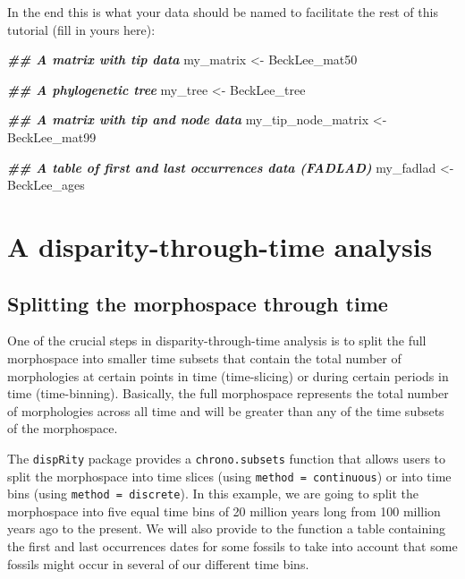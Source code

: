 \documentclass[
]{book}
\newenvironment{Shaded}{\begin{snugshade}}{\end{snugshade}}
\newcommand{\DocumentationTok}[1]{\textcolor[rgb]{0.56,0.35,0.01}{\textbf{\textit{#1}}}}
\newcommand{\NormalTok}[1]{#1}
\newcommand{\OtherTok}[1]{\textcolor[rgb]{0.56,0.35,0.01}{#1}}
\begin{document}
In the end this is what your data should be named to facilitate the rest of this tutorial (fill in yours here):

\begin{Shaded}
\begin{Highlighting}[]
\DocumentationTok{\#\# A matrix with tip data}
\NormalTok{my\_matrix }\OtherTok{\textless{}{-}}\NormalTok{ BeckLee\_mat50}

\DocumentationTok{\#\# A phylogenetic tree }
\NormalTok{my\_tree }\OtherTok{\textless{}{-}}\NormalTok{ BeckLee\_tree}

\DocumentationTok{\#\# A matrix with tip and node data}
\NormalTok{my\_tip\_node\_matrix }\OtherTok{\textless{}{-}}\NormalTok{ BeckLee\_mat99}

\DocumentationTok{\#\# A table of first and last occurrences data (FADLAD)}
\NormalTok{my\_fadlad }\OtherTok{\textless{}{-}}\NormalTok{ BeckLee\_ages}
\end{Highlighting}
\end{Shaded}

\hypertarget{a-disparity-through-time-analysis}{%
\section{A disparity-through-time analysis}\label{a-disparity-through-time-analysis}}

\hypertarget{splitting-the-morphospace-through-time}{%
\subsection{Splitting the morphospace through time}\label{splitting-the-morphospace-through-time}}

One of the crucial steps in disparity-through-time analysis is to split the full morphospace into smaller time subsets that contain the total number of morphologies at certain points in time (time-slicing) or during certain periods in time (time-binning).
Basically, the full morphospace represents the total number of morphologies across all time and will be greater than any of the time subsets of the morphospace.

The \texttt{dispRity} package provides a \texttt{chrono.subsets} function that allows users to split the morphospace into time slices (using \texttt{method\ =\ continuous}) or into time bins (using \texttt{method\ =\ discrete}).
In this example, we are going to split the morphospace into five equal time bins of 20 million years long from 100 million years ago to the present.
We will also provide to the function a table containing the first and last occurrences dates for some fossils to take into account that some fossils might occur in several of our different time bins.
\end{document}
